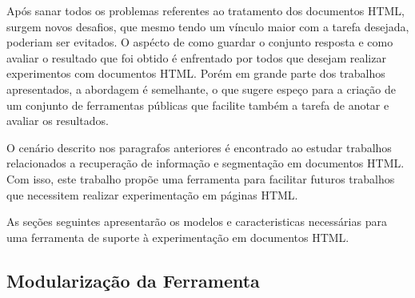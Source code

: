 \documentclass{acm_proc_article-sp}
\numberwithin{equation}{section}
\begin{document}

Após sanar todos os problemas referentes ao tratamento dos documentos
HTML, surgem novos desafios, que mesmo tendo um vínculo maior com a tarefa
desejada, poderiam ser evitados. O aspécto de como guardar o conjunto
resposta e como avaliar o resultado que foi obtido é enfrentado por
todos que desejam realizar experimentos com documentos HTML. Porém em
grande parte dos trabalhos apresentados, a abordagem é semelhante, o que
sugere espeço para a criação de um conjunto de ferramentas públicas que
facilite também a tarefa de anotar e avaliar os resultados.

O cenário descrito nos paragrafos anteriores é encontrado ao estudar trabalhos
relacionados a recuperação de informação e segmentação em documentos
HTML. Com isso, este trabalho propõe uma ferramenta para
facilitar futuros trabalhos que necessitem realizar experimentação em páginas
HTML.

As seções seguintes apresentarão os modelos e caracteristicas
necessárias para uma ferramenta de suporte à experimentação em
documentos HTML.

  \subsection{Modularização da Ferramenta}






\end{document}
